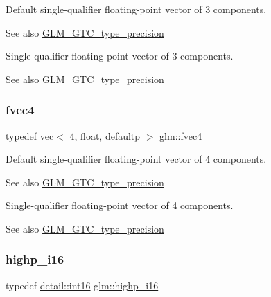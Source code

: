 Default single-\/qualifier floating-\/point vector of 3 components. \begin{DoxySeeAlso}{See also}
\mbox{\hyperlink{group__gtc__type__precision}{G\+L\+M\+\_\+\+G\+T\+C\+\_\+type\+\_\+precision}}
\end{DoxySeeAlso}
Single-\/qualifier floating-\/point vector of 3 components. \begin{DoxySeeAlso}{See also}
\mbox{\hyperlink{group__gtc__type__precision}{G\+L\+M\+\_\+\+G\+T\+C\+\_\+type\+\_\+precision}} 
\end{DoxySeeAlso}
\mbox{\label{group__gtc__type__precision_ga0319cdd208269c180e326b243e2e84e4}} 
\subsubsection{\texorpdfstring{fvec4}{fvec4}}
{\footnotesize\ttfamily typedef \mbox{\hyperlink{structglm_1_1vec}{vec}}$<$ 4, float, \mbox{\hyperlink{namespaceglm_a36ed105b07c7746804d7fdc7cc90ff25a9d21ccd8b5a009ec7eb7677befc3bf51}{defaultp}} $>$ \mbox{\hyperlink{group__gtc__type__precision_ga0319cdd208269c180e326b243e2e84e4}{glm\+::fvec4}}}

Default single-\/qualifier floating-\/point vector of 4 components. \begin{DoxySeeAlso}{See also}
\mbox{\hyperlink{group__gtc__type__precision}{G\+L\+M\+\_\+\+G\+T\+C\+\_\+type\+\_\+precision}}
\end{DoxySeeAlso}
Single-\/qualifier floating-\/point vector of 4 components. \begin{DoxySeeAlso}{See also}
\mbox{\hyperlink{group__gtc__type__precision}{G\+L\+M\+\_\+\+G\+T\+C\+\_\+type\+\_\+precision}} 
\end{DoxySeeAlso}
\mbox{\label{group__gtc__type__precision_gaa04399853952dbce29cb62e2432f350a}} 
\subsubsection{\texorpdfstring{highp\+\_\+i16}{highp\_i16}}
{\footnotesize\ttfamily typedef \mbox{\hyperlink{namespaceglm_1_1detail_a375938874ca4f0a0982ec6373b56117b}{detail\+::int16}} \mbox{\hyperlink{group__gtc__type__precision_gaa04399853952dbce29cb62e2432f350a}{glm\+::highp\+\_\+i16}}}

